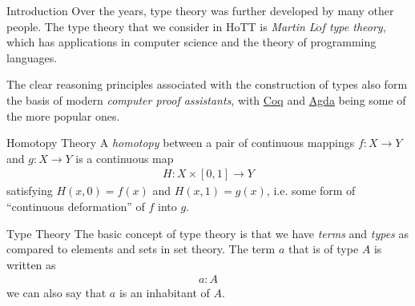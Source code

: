 \documentclass[10pt]{beamer}
\begin{document}
\begin{frame}{Introduction}
Over the years, type theory was further developed by many other people. The type theory that we consider in HoTT is \emph{Martin L$\ddot{\text{o}}$f type theory}, which has applications in computer science and the theory of programming languages. 

The clear reasoning principles associated with the construction of types also form the basis of modern \emph{computer proof assistants}, with \href{https://coq.inria.fr/}{Coq} and \href{http://wiki.portal.chalmers.se/agda/pmwiki.php}{Agda} being some of the more popular ones.

\end{frame}

\begin{frame}{Homotopy Theory}
A \emph{homotopy} between a pair of continuous mappings $f: X \to Y$ and $g: X \to Y$ is a continuous map
\begin{align*}
H: X \times [0,1] \to Y
\end{align*}
satisfying $H(x,0) = f(x)$ and $H(x,1) = g(x)$, i.e. some form of ``continuous deformation'' of $f$ into $g$.
\end{frame}




\begin{frame}{Type Theory}
The basic concept of type theory is that we have \emph{terms} and \emph{types} as compared to elements and sets in set theory. The term $a$ that is of type $A$ is written as
\begin{align*}
a :A
\end{align*} 
we can also say that $a$ is an inhabitant of $A$.


\end{frame}
\end{document}
